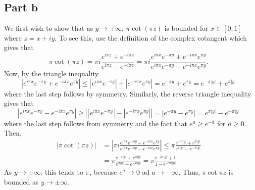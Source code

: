 \documentclass{article}
\begin{document}
\subsection{Part b}
We first wish to show that as $y\to\pm\infty$, $\pi\cot(\pi z)$ is bounded for $x\in[0,1]$ where $z=x+iy$. To see this, use the definition of the complex cotangent which gives that
\[
\pi\cot(\pi z)=\pi i\frac{e^{i\pi z}+e^{-i\pi z}}{e^{i\pi z}-e^{-i\pi z}}=\pi i\frac{e^{i\pi x}e^{-\pi y}+e^{-i\pi x}e^{\pi y}}{e^{i\pi x}e^{-\pi y}-e^{-i\pi x}e^{\pi y}}.
\]
Now, by the triangle inequality
\[
|e^{i\pi x}e^{-\pi y}+e^{-i\pi x}e^{\pi y}|\leq|e^{i\pi x}e^{-\pi y}|+|e^{-i\pi x}e^{\pi y}|=e^{-\pi y}+e^{\pi y}=e^{-\pi |y|}+e^{\pi |y|}
\]
where the last step follows by symmetry. Similarly, the reverse triangle inequality gives that 
\[
|e^{i\pi x}e^{-\pi y}-e^{-i\pi x}e^{\pi y}|\geq\left||e^{i\pi x}e^{-\pi y}|-|e^{-i\pi x}e^{\pi y}|\right|=|e^{-\pi y}-e^{\pi y}|=e^{\pi |y|}-e^{-\pi |y|}
\]
where the last step follows from symmetry and the fact that $e^a\geq e^{-a}$ for $a\geq0$. Then, 
\begin{align*}
|\pi\cot(\pi z)|&=\left|\pi i\frac{e^{i\pi x}e^{-\pi y}+e^{-i\pi x}e^{\pi y}}{e^{i\pi x}e^{-\pi y}-e^{-i\pi x}e^{\pi y}}\right|\leq\pi\frac{e^{-\pi |y|}+e^{\pi |y|}}{e^{\pi |y|}-e^{-\pi |y|}}\\&=
\pi\frac{e^{-\pi |y|}+e^{\pi |y|}}{e^{\pi |y|}-e^{-\pi |y|}}=\pi\frac{e^{-2\pi |y|}+1}{1-e^{-2\pi |y|}}
\end{align*}
As $y\to\pm\infty$, this tends to $\pi$, because $e^a\to0$ ad $a\to-\infty$. Thus, $\pi\cot{\pi z}$ is bounded as $y\to\pm\infty$.\\
\end{document}

